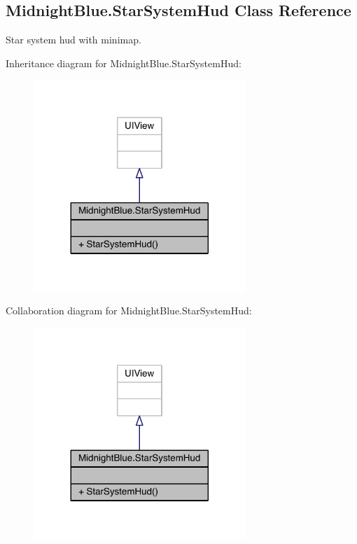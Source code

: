 \hypertarget{class_midnight_blue_1_1_star_system_hud}{}\subsection{Midnight\+Blue.\+Star\+System\+Hud Class Reference}
\label{class_midnight_blue_1_1_star_system_hud}


Star system hud with minimap.  




Inheritance diagram for Midnight\+Blue.\+Star\+System\+Hud\+:\nopagebreak
\begin{figure}[H]
\begin{center}
\leavevmode
\includegraphics[width=227pt]{class_midnight_blue_1_1_star_system_hud__inherit__graph}
\end{center}
\end{figure}


Collaboration diagram for Midnight\+Blue.\+Star\+System\+Hud\+:\nopagebreak
\begin{figure}[H]
\begin{center}
\leavevmode
\includegraphics[width=227pt]{class_midnight_blue_1_1_star_system_hud__coll__graph}
\end{center}
\end{figure}
